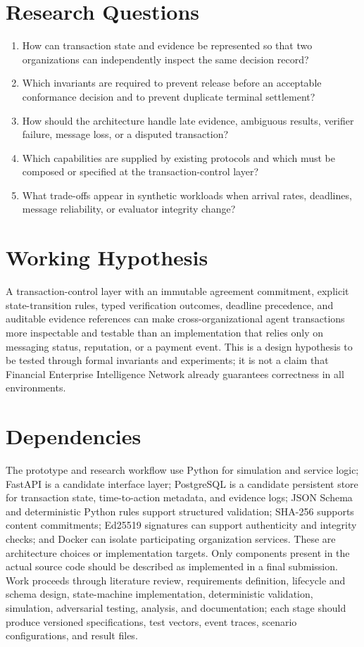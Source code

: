 \documentclass[12pt,a4paper,oneside]{report}
\begin{document}
\section{Research Questions}
\begin{enumerate}[leftmargin=*]
\item How can transaction state and evidence be represented so that two organizations can independently inspect the same decision record?
\item Which invariants are required to prevent release before an acceptable conformance decision and to prevent duplicate terminal settlement?
\item How should the architecture handle late evidence, ambiguous results, verifier failure, message loss, or a disputed transaction?
\item Which capabilities are supplied by existing protocols and which must be composed or specified at the transaction-control layer?
\item What trade-offs appear in synthetic workloads when arrival rates, deadlines, message reliability, or evaluator integrity change?
\end{enumerate}

\section{Working Hypothesis}
A transaction-control layer with an immutable agreement commitment, explicit state-transition rules, typed verification outcomes, deadline precedence, and auditable evidence references can make cross-organizational agent transactions more inspectable and testable than an implementation that relies only on messaging status, reputation, or a payment event. This is a design hypothesis to be tested through formal invariants and experiments; it is not a claim that Financial Enterprise Intelligence Network already guarantees correctness in all environments.

\section{Dependencies}
The prototype and research workflow use Python for simulation and service logic; FastAPI is a candidate interface layer; PostgreSQL is a candidate persistent store for transaction state, time-to-action metadata, and evidence logs; JSON Schema and deterministic Python rules support structured validation; SHA-256 supports content commitments; Ed25519 signatures can support authenticity and integrity checks; and Docker can isolate participating organization services. These are architecture choices or implementation targets. Only components present in the actual source code should be described as implemented in a final submission. Work proceeds through literature review, requirements definition, lifecycle and schema design, state-machine implementation, deterministic validation, simulation, adversarial testing, analysis, and documentation; each stage should produce versioned specifications, test vectors, event traces, scenario configurations, and result files.
\end{document}
